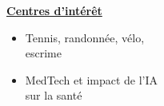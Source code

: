 \documentclass[letterpaper,10pt]{article}
\begin{document}
\begin{minipage}[t]{0.28\textwidth}
  \raggedright
  \textbf{\underline{Centres d'intérêt}}\\[-2pt]
  {\scriptsize
    \begin{itemize}[leftmargin=*,itemsep=1pt,parsep=0pt,topsep=0pt,partopsep=0pt]
      \item Tennis, randonnée, vélo, \\escrime
      \item MedTech et impact de l'IA \\sur la santé
    \end{itemize}
  }
\end{minipage}



\end{document}
